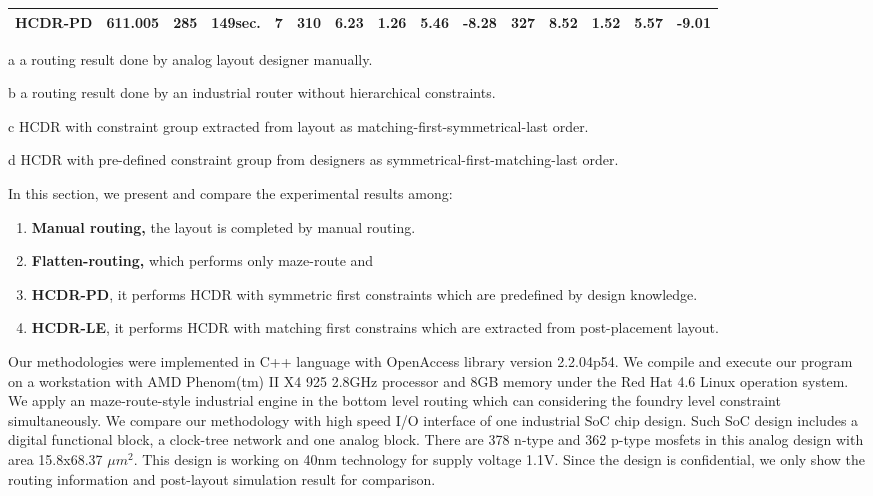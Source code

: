 \begin{table}
\begin{lrbox}{\tablebox}
\begin{threeparttable}
\begin{small}
\begin{tabular}{|l|c|c|c|c|c|c|c|c|c|c|c|c|c|c|}
            \hline
            HCDR-PD\tnote{d}    &   611.005   & 285   & 149sec.   & {\bf7}  & 310     &{\bf 6.23} & 1.26    & 5.46    
            &{\bf -8.28}  & {\bf 327} &{\bf 8.52} &{\bf 1.52} & {\bf 5.57}  &{\bf -9.01}\\  
            \hline
      \end{tabular}
      \end{small}
      \begin{tablenotes}
        \item [a] a routing result done by analog layout designer manually.
        \item [b] a routing result done by an industrial router without hierarchical constraints.
        \item [c] HCDR with constraint group extracted from layout as matching-first-symmetrical-last order.
        \item [d] HCDR with pre-defined constraint group from designers as symmetrical-first-matching-last order.
      \end{tablenotes}
      \end{threeparttable}
      \end{lrbox}
      \scalebox{0.8}{\usebox{\tablebox}}
    \end{table}


    In this section, we present and compare the experimental results among:
    \begin{enumerate}
      \item {\bf Manual routing,} the layout is completed by manual routing.
      \item {\bf Flatten-routing,} which performs only maze-route and  
      \item {\bf HCDR-PD}, it performs HCDR with symmetric first constraints which are predefined by design knowledge. 
      \item {\bf HCDR-LE}, it performs HCDR with matching first constrains which are extracted from post-placement layout.
    \end{enumerate} 
    Our methodologies were implemented in C++ language with OpenAccess library version 2.2.04p54. We compile and execute our program on a workstation with AMD Phenom(tm) II X4 925 2.8GHz processor and 8GB memory under the Red Hat 4.6 Linux operation system. We apply an maze-route-style industrial engine in the bottom level routing which can considering the foundry level constraint simultaneously. We compare our methodology with high speed I/O interface of one industrial SoC chip design. Such SoC design includes a digital functional block, a clock-tree network and one analog block. There are 378 n-type and 362 p-type mosfets in this analog design with area 15.8x68.37 ${{\mu}m}^2$. This design is working on 40nm technology for supply voltage 1.1V. Since the design is confidential, we only show the routing information and post-layout simulation result for comparison.

